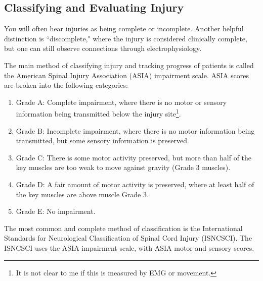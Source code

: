 \subsection{Classifying and Evaluating Injury}

You will often hear injuries as being complete or incomplete. Another helpful distinction is ``discomplete," where the injury is considered clinically complete, but one can still observe connections through electrophysiology.\newline

The main method of classifying injury and tracking progress of patients is called the American Spinal Injury Association (ASIA) impairment scale. ASIA scores are broken into the following categories: 

\begin{enumerate}
    \itemsep 0em
    \item Grade A: Complete impairment, where there is no motor or sensory information being transmitted below the injury site\footnote{It is not clear to me if this is measured by EMG or movement.}.
    \item Grade B: Incomplete impairment, where there is no motor information being transmitted, but some sensory information is preserved. 
    \item Grade C: There is some motor activity preserved, but more than half of the key muscles are too weak to move against gravity (Grade 3 muscles). 
    \item Grade D: A fair amount of motor activity is preserved, where at least half of the key muscles are above muscle Grade 3.
    \item Grade E: No impairment. 
\end{enumerate}

The most common and complete method of classification is the International Standards for Neurological Classification of Spinal Cord Injury (ISNCSCI). The ISNCSCI uses the ASIA impairment scale, with ASIA motor and sensory scores.\newline

